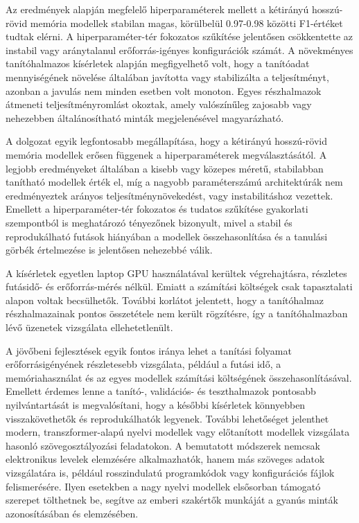 Az eredmények alapján megfelelő hiperparaméterek mellett a kétirányú hosszú-rövid memória modellek stabilan magas, körülbelül 0.97-0.98 közötti F1-értéket tudtak elérni. A hiperparaméter-tér fokozatos szűkítése jelentősen csökkentette az instabil vagy aránytalanul erőforrás-igényes konfigurációk számát. A növekményes tanítóhalmazos kísérletek alapján megfigyelhető volt, hogy a tanítóadat mennyiségének növelése általában javította vagy stabilizálta a teljesítményt, azonban a javulás nem minden esetben volt monoton. Egyes részhalmazok átmeneti teljesítményromlást okoztak, amely valószínűleg zajosabb vagy nehezebben általánosítható minták megjelenésével magyarázható.

A dolgozat egyik legfontosabb megállapítása, hogy a kétirányú hosszú-rövid memória modellek erősen függenek a hiperparaméterek megválasztásától. A legjobb eredményeket általában a kisebb vagy közepes méretű, stabilabban tanítható modellek érték el, míg a nagyobb paraméterszámú architektúrák nem eredményeztek arányos teljesítménynövekedést, vagy instabilitáshoz vezettek. Emellett a hiperparaméter-tér fokozatos és tudatos szűkítése gyakorlati szempontból is meghatározó tényezőnek bizonyult, mivel a stabil és reprodukálható futások hiányában a modellek összehasonlítása és a tanulási görbék értelmezése is jelentősen nehezebbé válik.

A kísérletek egyetlen laptop GPU használatával kerültek végrehajtásra, részletes futásidő- és erőforrás-mérés nélkül. Emiatt a számítási költségek csak tapasztalati alapon voltak becsülhetők. További korlátot jelentett, hogy a tanítóhalmaz részhalmazainak pontos összetétele nem került rögzítésre, így a tanítóhalmazban lévő üzenetek vizsgálata ellehetetlenült.

A jövőbeni fejlesztések egyik fontos iránya lehet a tanítási folyamat erőforrásigényének részletesebb vizsgálata, például a futási idő, a memóriahasználat és az egyes modellek számítási költségének összehasonlításával. Emellett érdemes lenne a tanító-, validációs- és teszthalmazok pontosabb nyilvántartását is megvalósítani, hogy a későbbi kísérletek könnyebben visszakövethetők és reprodukálhatók legyenek. További lehetőséget jelenthet modern, transzformer-alapú nyelvi modellek vagy előtanított modellek vizsgálata hasonló szövegosztályozási feladatokon. A bemutatott módszerek nemcsak elektronikus levelek elemzésére alkalmazhatók, hanem más szöveges adatok vizsgálatára is, például rosszindulatú programkódok vagy konfigurációs fájlok felismerésére. Ilyen esetekben a nagy nyelvi modellek elsősorban támogató szerepet tölthetnek be, segítve az emberi szakértők munkáját a gyanús minták azonosításában és elemzésében.

